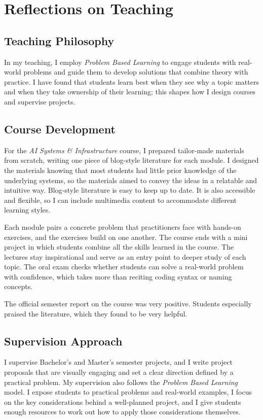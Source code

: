 \label{sec:teaching-reflections}
\section*{Reflections on Teaching}

\subsection*{Teaching Philosophy}
In my teaching, I employ \textit{Problem Based Learning} to engage students with real-world problems and guide them to develop solutions that combine theory with practice.
I have found that students learn best when they see why a topic matters and when they take ownership of their learning; this shapes how I design courses and supervise projects.

\subsection*{Course Development}
For the \textit{AI Systems \& Infrastructure} course, I prepared tailor-made materials from scratch, writing one piece of blog-style literature for each module.
I designed the materials knowing that most students had little prior knowledge of the underlying systems, so the materials aimed to convey the ideas in a relatable and intuitive way.
Blog-style literature is easy to keep up to date. It is also accessible and flexible, so I can include multimedia content to accommodate different learning styles.

\vspace{\entryskip}
Each module pairs a concrete problem that practitioners face with hands-on exercises, and the exercises build on one another.
The course ends with a mini project in which students combine all the skills learned in the course.
The lectures stay inspirational and serve as an entry point to deeper study of each topic.
The oral exam checks whether students can solve a real-world problem with confidence, which takes more than reciting coding syntax or naming concepts.

\vspace{\entryskip}
The official semester report on the course was very positive. Students especially praised the literature, which they found to be very helpful.

\subsection*{Supervision Approach}
I supervise Bachelor's and Master's semester projects, and I write project proposals that are visually engaging and set a clear direction defined by a practical problem.
My supervision also follows the \textit{Problem Based Learning} model.
I expose students to practical problems and real-world examples, I focus on the key considerations behind a well-planned project, and I give students enough resources to work out how to apply those considerations themselves.

